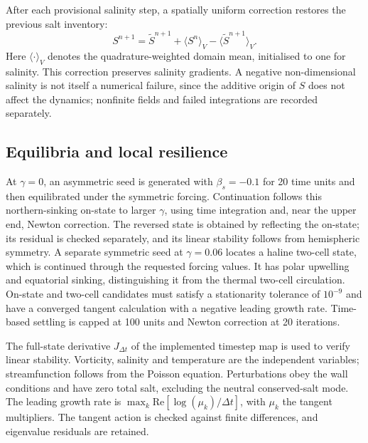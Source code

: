\documentclass[12pt, a4paper]{article}
\begin{document}
After each provisional salinity step, a spatially uniform correction restores the previous salt inventory:
\begin{equation}
  S^{n+1}=\widetilde S^{n+1}+\langle S^n\rangle_V-\langle\widetilde S^{n+1}\rangle_V.
\end{equation}
Here $\langle\cdot\rangle_V$ denotes the quadrature-weighted domain mean, initialised to one for salinity. This correction preserves salinity gradients. A negative non-dimensional salinity is not itself a numerical failure, since the additive origin of $S$ does not affect the dynamics; nonfinite fields and failed integrations are recorded separately.

\subsection*{Equilibria and local resilience}

At $\gamma=0$, an asymmetric seed is generated with $\beta_s=-0.1$ for 20 time units and then equilibrated under the symmetric forcing. Continuation follows this northern-sinking on-state to larger $\gamma$, using time integration and, near the upper end, Newton correction. The reversed state is obtained by reflecting the on-state; its residual is checked separately, and its linear stability follows from hemispheric symmetry. A separate symmetric seed at $\gamma=0.06$ locates a haline two-cell state, which is continued through the requested forcing values. It has polar upwelling and equatorial sinking, distinguishing it from the thermal two-cell circulation. On-state and two-cell candidates must satisfy a stationarity tolerance of $10^{-9}$ and have a converged tangent calculation with a negative leading growth rate. Time-based settling is capped at 100 units and Newton correction at 20 iterations.

The full-state derivative $J_{\Delta t}$ of the implemented timestep map is used to verify linear stability. Vorticity, salinity and temperature are the independent variables; streamfunction follows from the Poisson equation. Perturbations obey the wall conditions and have zero total salt, excluding the neutral conserved-salt mode. The leading growth rate is $\max_k\mathrm{Re}[\log(\mu_k)/\Delta t]$, with $\mu_k$ the tangent multipliers. The tangent action is checked against finite differences, and eigenvalue residuals are retained.
\end{document}
